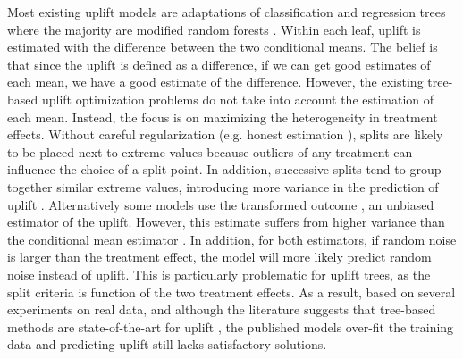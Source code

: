 \documentclass{article}
\begin{document}
Most existing uplift models are adaptations of classification and regression trees \citep{breiman1984classification} where the majority are modified random forests \citep{Breiman-RandomForest-2001, radcliffe2011real, jaskowski2012uplift, guelman2012random}. Within each leaf, uplift is estimated with the difference between the two conditional means. The belief is that since the uplift is defined as a difference, if we can get good estimates of each mean, we have a good estimate of the difference. However, the existing tree-based uplift optimization problems do not take into account the estimation of each mean. Instead, the focus is on maximizing the heterogeneity in treatment effects. Without careful regularization (e.g. honest estimation \citep{athey2019generalized}), splits are likely to be placed next to extreme values because outliers of any treatment can influence the choice of a split point. In addition, successive splits tend to group together similar extreme values, introducing more variance in the prediction of uplift \citep{zhao2017practically}. Alternatively some models use the transformed outcome \citep{athey2015machine}, an unbiased estimator of the uplift. However, this estimate suffers from higher variance than the conditional mean estimator \citep{powers2018some}. In addition, for both estimators, if random noise is larger than the treatment effect, the model will more likely predict random noise instead of uplift. This is particularly problematic for uplift trees, as the split criteria is function of the two treatment effects. As a result, based on several experiments on real data, and although the literature suggests that tree-based methods are state-of-the-art for uplift \citep{soltys2015ensemble}, the published models over-fit the training data and predicting uplift still lacks satisfactory solutions.
\end{document}
